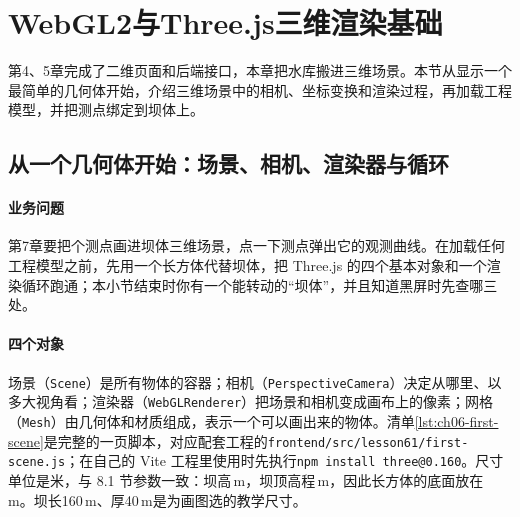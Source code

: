\section{WebGL2与Three.js三维渲染基础}

第4、5章完成了二维页面和后端接口，本章把水库搬进三维场景。本节从显示一个最简单的几何体开始，介绍三维场景中的相机、坐标变换和渲染过程，再加载工程模型，并把测点绑定到坝体上。

\subsection{从一个几何体开始：场景、相机、渲染器与循环}

\paragraph{业务问题}第7章要把\cpStationCount 个测点画进坝体三维场景，点一下测点弹出它的观测曲线。在加载任何工程模型之前，先用一个长方体代替坝体，把 Three.js 的四个基本对象和一个渲染循环跑通；本小节结束时你有一个能转动的“坝体”，并且知道黑屏时先查哪三处。

\paragraph{四个对象}场景（\texttt{Scene}）是所有物体的容器；相机（\texttt{PerspectiveCamera}）决定从哪里、以多大视角看；渲染器（\texttt{WebGLRenderer}）把场景和相机变成画布上的像素；网格（\texttt{Mesh}）由几何体和材质组成，表示一个可以画出来的物体。清单\ref{lst:ch06-first-scene}是完整的一页脚本，对应配套工程的\texttt{frontend/src/lesson61/first-scene.js}；在自己的 Vite 工程里使用时先执行\texttt{npm install three@0.160}。尺寸单位是米，与 8.1 节参数一致：坝高\cpDamHeight\,m，坝顶高程\cpCrestElev\,m，因此长方体的底面放在 \cpBaseElev\,m。坝长160\,m、厚40\,m是为画图选的教学尺寸。

